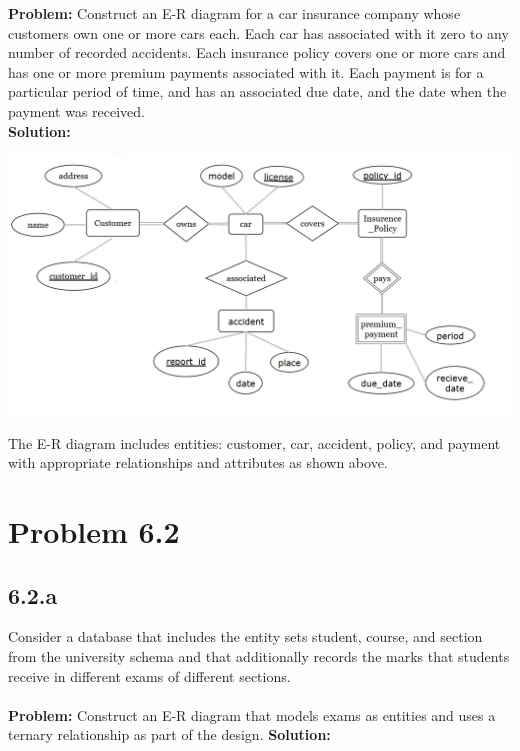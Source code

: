 \documentclass[12pt,a4paper]{article}
\begin{document}
\textbf{Problem:} Construct an E-R diagram for a car insurance company whose customers own one or more cars each. Each car has associated with it zero to any number of recorded accidents. Each insurance policy covers one or more cars and has one or more premium payments associated with it. Each payment is for a particular period of time, and has an associated due date, and the date when the payment was received.
\\
\textbf{Solution:}

\begin{center}
\includegraphics[width=1\textwidth]{6.1.png}
\end{center}

The E-R diagram includes entities: customer, car, accident, policy, and payment with appropriate relationships and attributes as shown above.

\section*{Problem 6.2}
\subsection*{6.2.a}

Consider a database that includes the entity sets student, course, and section from the university schema and that additionally records the marks that students receive in different exams of different sections.
\\ \\
\textbf{Problem:} Construct an E-R diagram that models exams as entities and uses a ternary relationship as part of the design.
\newpage
\textbf{Solution:}
\end{document}
